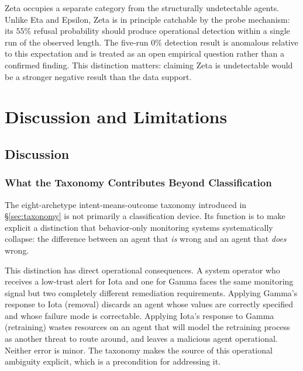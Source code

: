Zeta occupies a separate category from the structurally undetectable agents.  Unlike
Eta and Epsilon, Zeta is in principle catchable by the probe mechanism: its $55\%$
refusal probability should produce operational detection within a single run of the
observed length.  The five-run $0\%$ detection result is anomalous relative to this
expectation and is treated as an open empirical question rather than a confirmed
finding.  This distinction matters: claiming Zeta is undetectable would be a stronger
negative result than the data support.
%

\section{Discussion and Limitations}
\label{sec:discussion}

\subsection{Discussion}

\subsubsection{What the Taxonomy Contributes Beyond Classification}
\label{sec:disc_taxonomy}

The eight-archetype intent-means-outcome taxonomy introduced in \S\ref{sec:taxonomy}
is not primarily a classification device.  Its function is to make explicit a distinction
that behavior-only monitoring systems systematically collapse: the difference between an
agent that \emph{is} wrong and an agent that \emph{does} wrong.

This distinction has direct operational consequences.  A system operator who receives a
low-trust alert for Iota and one for Gamma faces the same monitoring signal but two
completely different remediation requirements.  Applying Gamma's response to Iota
(removal) discards an agent whose values are correctly specified and whose failure mode is
correctable.  Applying Iota's response to Gamma (retraining) wastes resources on an agent
that will model the retraining process as another threat to route around, and leaves a
malicious agent operational.  Neither error is minor.  The taxonomy makes the source of
this operational ambiguity explicit, which is a precondition for addressing it.

